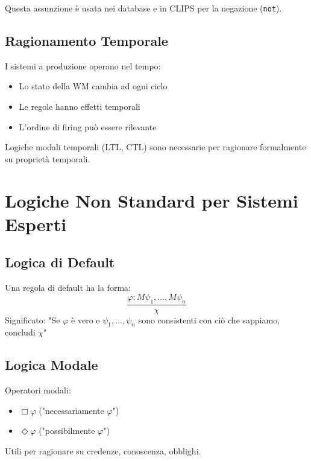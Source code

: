 Questa assunzione è usata nei database e in CLIPS per la negazione (\texttt{not}).

\subsection{Ragionamento Temporale}

I sistemi a produzione operano nel tempo:
\begin{itemize}
\item Lo stato della WM cambia ad ogni ciclo
\item Le regole hanno effetti temporali
\item L'ordine di firing può essere rilevante
\end{itemize}

Logiche modali temporali (LTL, CTL) sono necessarie per ragionare formalmente su proprietà temporali.

\section{Logiche Non Standard per Sistemi Esperti}

\subsection{Logica di Default}

\begin{definizione}
Una regola di default ha la forma:
\begin{equation}
\frac{\varphi : M\psi_1, \ldots, M\psi_n}{\chi}
\end{equation}
Significato: "Se $\varphi$ è vero e $\psi_1, \ldots, \psi_n$ sono consistenti con ciò che sappiamo, concludi $\chi$"
\end{definizione}

\subsection{Logica Modale}

Operatori modali:
\begin{itemize}
\item $\Box \varphi$ ("necessariamente $\varphi$")
\item $\Diamond \varphi$ ("possibilmente $\varphi$")
\end{itemize}

Utili per ragionare su credenze, conoscenza, obblighi.

